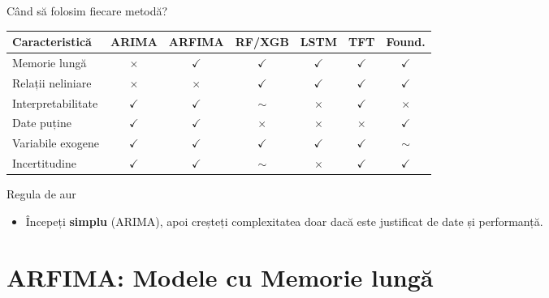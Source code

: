 \documentclass[9pt, aspectratio=169, t]{beamer}
\begin{document}
\begin{frame}{Când să folosim fiecare metodă?}
    \begin{cminipage}{0.95\textwidth}
        \begin{center}
            {\footnotesize
            \begin{tabular}{l|c|c|c|c|c|c}
                \toprule
                \textbf{Caracteristică} & \textbf{ARIMA} & \textbf{ARFIMA} & \textbf{RF/XGB} & \textbf{LSTM} & \textbf{TFT} & \textbf{Found.} \\
                \midrule
                Memorie lungă & $\times$ & $\checkmark$ & $\checkmark$ & $\checkmark$ & $\checkmark$ & $\checkmark$ \\
                Relații neliniare & $\times$ & $\times$ & $\checkmark$ & $\checkmark$ & $\checkmark$ & $\checkmark$ \\
                Interpretabilitate & $\checkmark$ & $\checkmark$ & $\sim$ & $\times$ & $\checkmark$ & $\times$ \\
                Date puține & $\checkmark$ & $\checkmark$ & $\times$ & $\times$ & $\times$ & $\checkmark$ \\
                Variabile exogene & $\checkmark$ & $\checkmark$ & $\checkmark$ & $\checkmark$ & $\checkmark$ & $\sim$ \\
                Incertitudine & $\checkmark$ & $\checkmark$ & $\sim$ & $\times$ & $\checkmark$ & $\checkmark$ \\
                \bottomrule
            \end{tabular}
            }
        \end{center}

        \vspace{0.1cm}

        \begin{exampleblock}{Regula de aur}
            \begin{itemize}\setlength{\itemsep}{0pt}
                \item Începeți \textbf{simplu} (ARIMA), apoi creșteți complexitatea doar dacă este justificat de date și performanță.
            \end{itemize}
        \end{exampleblock}
    \end{cminipage}
\end{frame}

\section{ARFIMA: Modele cu Memorie lungă}
\end{document}
